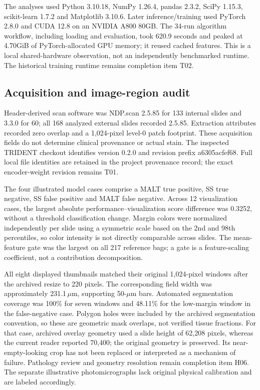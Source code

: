 The analyses used Python 3.10.18, NumPy 1.26.4, pandas 2.3.2, SciPy 1.15.3, scikit-learn 1.7.2 and Matplotlib 3.10.6. Later inference/training used PyTorch 2.8.0 and CUDA 12.8 on an NVIDIA A800 80GB. The 34-run algorithm workflow, including loading and evaluation, took 620.9 seconds and peaked at 4.70GiB of PyTorch-allocated GPU memory; it reused cached features. This is a local shared-hardware observation, not an independently benchmarked runtime. The historical training runtime remains completion item T02.

\subsection{Acquisition and image-region audit}
Header-derived scan software was NDP.scan 2.5.85 for 133 internal slides and 3.3.0 for 60; all 168 analyzed external slides recorded 2.5.85. Extraction attributes recorded zero overlap and a 1,024-pixel level-0 patch footprint. These acquisition fields do not determine clinical provenance or actual stain. The inspected TRIDENT checkout identifies version 0.2.0 and revision prefix a6305acfef68. Full local file identities are retained in the project provenance record; the exact encoder-weight revision remains T01.

The four illustrated model cases comprise a MALT true positive, SS true negative, SS false positive and MALT false negative. Across 12 visualization cases, the largest absolute performance--visualization score difference was 0.3252, without a threshold classification change. Margin colors were normalized independently per slide using a symmetric scale based on the 2nd and 98th percentiles, so color intensity is not directly comparable across slides. The mean-feature gate was the largest on all 217 reference bags; a gate is a feature-scaling coefficient, not a contribution decomposition.

All eight displayed thumbnails matched their original 1,024-pixel windows after the archived resize to 220 pixels. The corresponding field width was approximately 231.1$\,\mu$m, supporting 50-$\mu$m bars. Automated segmentation coverage was 100\% for seven windows and 48.11\% for the low-margin window in the false-negative case. Polygon holes were included by the archived segmentation convention, so these are geometric mask overlaps, not verified tissue fractions. For that case, archived overlay geometry used a slide height of 62,208 pixels, whereas the current reader reported 70,400; the original geometry is preserved. Its near-empty-looking crop has not been replaced or interpreted as a mechanism of failure. Pathology review and geometry resolution remain completion item H06. The separate illustrative photomicrographs lack original physical calibration and are labeled accordingly.
